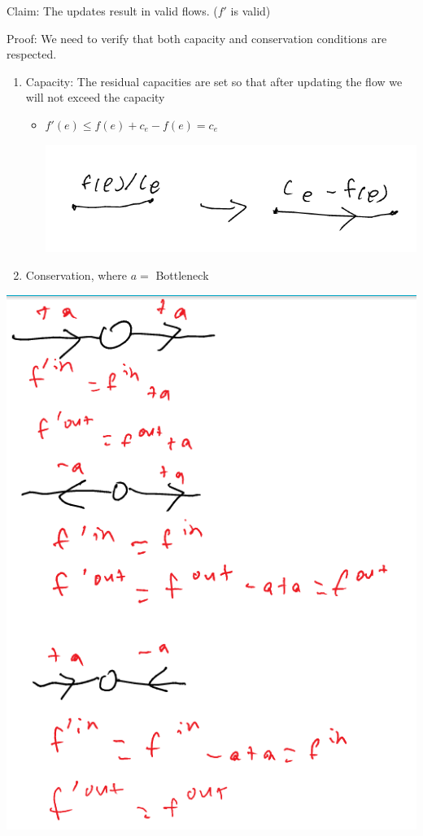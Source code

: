 \documentclass[11pt]{article}
\begin{document}
Claim: The updates result in valid flows. (\(f'\) is valid)

Proof: We need to verify that both capacity and conservation conditions are respected.
\begin{enumerate}
\item Capacity: The residual capacities are set so that after updating the flow we will not exceed the capacity 
\begin{itemize}
\item \(f'(e) \leq f(e) + c_e - f(e) = c_e\)
\begin{center}
\includegraphics[width=.9\linewidth]{./Images/i114.png}
\end{center}
\end{itemize}
\item Conservation, where \(a=\) Bottleneck
\end{enumerate}
\begin{center}
\includegraphics[width=.9\linewidth]{./Images/i115.png}
\end{center}
\end{document}
